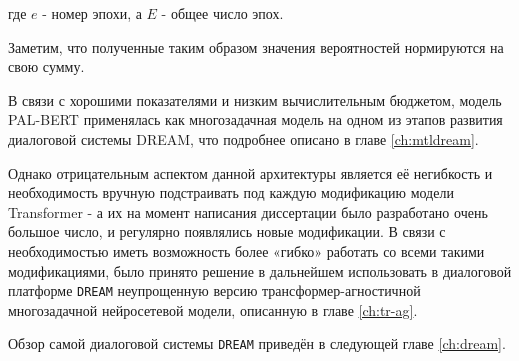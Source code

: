  где $e$ - номер эпохи, а $E$ - общее число эпох. 
 
Заметим, что полученные таким образом значения вероятностей нормируются на свою сумму. 

В связи с хорошими показателями и низким вычислительным бюджетом, модель PAL-BERT применялась как многозадачная модель на одном из этапов развития диалоговой системы DREAM, что подробнее описано в главе \ref{ch:mtldream}.

Однако отрицательным аспектом данной архитектуры является её негибкость и необходимость вручную подстраивать под каждую модификацию модели Transformer - а их на момент написания диссертации было разработано очень большое число, и регулярно появлялись новые модификации. В связи с необходимостью иметь возможность более «гибко» работать со всеми такими модификациями, было  принято решение в дальнейшем использовать в диалоговой платформе \texttt{DREAM} неупрощенную версию трансформер-агностичной многозадачной нейросетевой модели, описанную в главе \ref{ch:tr-ag}.

Обзор самой диалоговой системы \texttt{DREAM} приведён в следующей главе \ref{ch:dream}.
